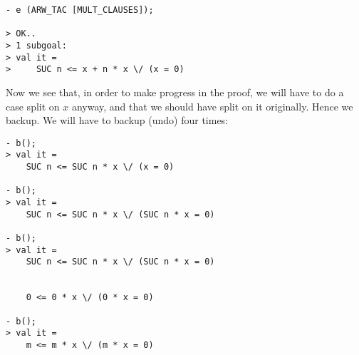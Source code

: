 \begin{session}\begin{verbatim}
- e (ARW_TAC [MULT_CLAUSES]);

> OK..
> 1 subgoal:
> val it =
>     SUC n <= x + n * x \/ (x = 0)
\end{verbatim}\end{session}
Now we see that, in order to make progress in the proof, we will have to
do a case split on $x$ anyway, and that we should have split on it
originally. Hence we backup. We will have to backup (undo) four times:
\begin{session}\begin{verbatim}
- b();
> val it =
    SUC n <= SUC n * x \/ (x = 0)

- b();
> val it =
    SUC n <= SUC n * x \/ (SUC n * x = 0)

- b();
> val it =
    SUC n <= SUC n * x \/ (SUC n * x = 0)


    0 <= 0 * x \/ (0 * x = 0)

- b();
> val it =
    m <= m * x \/ (m * x = 0)
\end{verbatim}\end{session}

